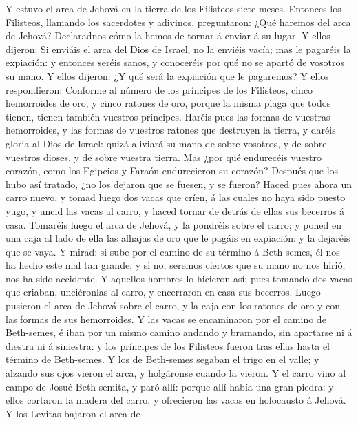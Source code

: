  Y estuvo el arca de Jehová en la tierra de los Filisteos
siete meses.  Entonces los Filisteos, llamando los
sacerdotes y adivinos, preguntaron: ¿Qué haremos del arca de Jehová?
Declaradnos cómo la hemos de tornar á enviar á su lugar.  Y
ellos dijeron: Si enviáis el arca del Dios de Israel, no la enviéis
vacía; mas le pagaréis la expiación: y entonces seréis sanos, y
conoceréis por qué no se apartó de vosotros su mano.  Y
ellos dijeron: ¿Y qué será la expiación que le pagaremos? Y ellos
respondieron: Conforme al número de los príncipes de los Filisteos,
cinco hemorroides de oro, y cinco ratones de oro, porque la misma plaga
que todos tienen, tienen también vuestros príncipes.  Haréis
pues las formas de vuestras hemorroides, y las formas de vuestros
ratones que destruyen la tierra, y daréis gloria al Dios de Israel:
quizá aliviará su mano de sobre vosotros, y de sobre vuestros dioses, y
de sobre vuestra tierra.  Mas ¿por qué endurecéis vuestro
corazón, como los Egipcios y Faraón endurecieron su corazón? Después que
los hubo así tratado, ¿no los dejaron que se fuesen, y se fueron?
 Haced pues ahora un carro nuevo, y tomad luego dos vacas
que críen, á las cuales no haya sido puesto yugo, y uncid las vacas al
carro, y haced tornar de detrás de ellas sus becerros á casa.
 Tomaréis luego el arca de Jehová, y la pondréis sobre el
carro; y poned en una caja al lado de ella las alhajas de oro que le
pagáis en expiación: y la dejaréis que se vaya.  Y mirad: si
sube por el camino de su término á Beth-semes, él nos ha hecho este mal
tan grande; y si no, seremos ciertos que su mano no nos hirió, nos ha
sido accidente.  Y aquellos hombres lo hicieron así; pues
tomando dos vacas que criaban, unciéronlas al carro, y encerraron en
casa sus becerros.  Luego pusieron el arca de Jehová sobre
el carro, y la caja con los ratones de oro y con las formas de sus
hemorroides.  Y las vacas se encaminaron por el camino de
Beth-semes, é iban por un mismo camino andando y bramando, sin apartarse
ni á diestra ni á siniestra: y los príncipes de los Filisteos fueron
tras ellas hasta el término de Beth-semes.  Y los de
Beth-semes segaban el trigo en el valle; y alzando sus ojos vieron el
arca, y holgáronse cuando la vieron.  Y el carro vino al
campo de Josué Beth-semita, y paró allí: porque allí había una gran
piedra: y ellos cortaron la madera del carro, y ofrecieron las vacas en
holocausto á Jehová.  Y los Levitas bajaron el arca de
